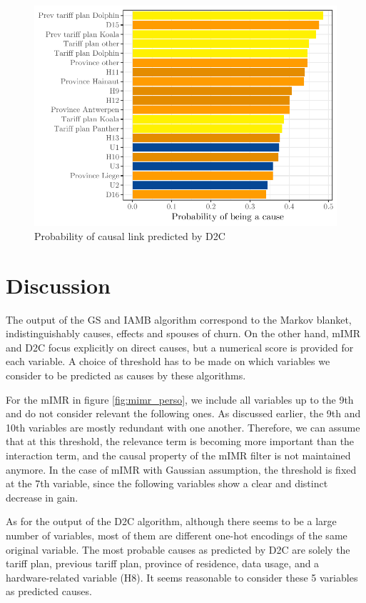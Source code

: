 \begin{figure}
    \centering
    \includegraphics[width=0.9\linewidth]{figures/d2c_proba.pdf}
    \caption{Probability of causal link predicted by D2C}
    \label{fig:d2c_proba}
\end{figure}

\section{Discussion}

The output of the GS and IAMB algorithm correspond to the Markov blanket,
indistinguishably causes, effects and spouses of churn. On the other hand, mIMR
and D2C focus explicitly on direct causes, but a numerical score is provided for
each variable. A choice of threshold has to be made on which variables we
consider to be predicted as causes by these algorithms.

For the mIMR in figure \ref{fig:mimr_perso}, we include all variables up to the
9th and do not consider relevant the following ones. As discussed earlier, the
9th and 10th variables are mostly redundant with one another. Therefore, we can
assume that at this threshold, the relevance term is becoming more important
than the interaction term, and the causal property of the mIMR filter is not
maintained anymore. In the case of mIMR with Gaussian assumption, the threshold
is fixed at the 7th variable, since the following variables show a clear and
distinct decrease in gain.

As for the output of the D2C algorithm, although there seems to be a large
number of variables, most of them are different one-hot encodings of the same
original variable. The most probable causes as predicted by D2C are solely the
tariff plan, previous tariff plan, province of residence, data usage, and a
hardware-related variable (H8). It seems reasonable to consider these 5
variables as predicted causes.

